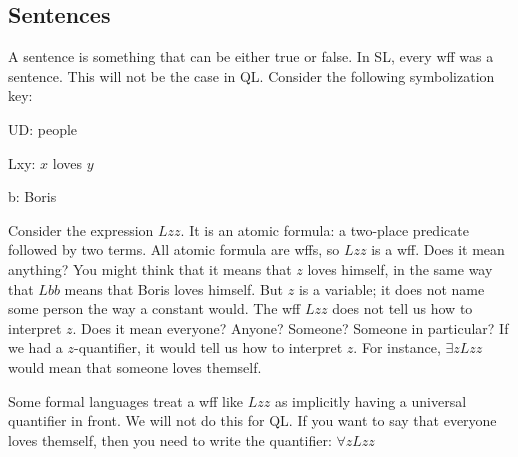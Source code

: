 






\subsection{Sentences}

A {sentence} is something that can be either true or false. In SL, every wff was a sentence. This will not be the case in QL. Consider the following symbolization key:
\begin{ekey}
\item[UD:] people
\item[Lxy:] $x$ loves $y$
\item[b:] Boris
\end{ekey}
Consider the expression $Lzz$. It is an atomic formula: a two-place predicate followed by two terms. All atomic formula are wffs, so $Lzz$ is a wff. Does it mean anything? You might think that it means that $z$ loves himself, in the same way that $Lbb$ means that Boris loves himself. But $z$ is a variable; it does not name some person the way a constant would. The wff $Lzz$ does not tell us how to interpret $z$. Does it mean everyone? Anyone? Someone? Someone in particular? If we had a $z$-quantifier, it would tell us how to interpret $z$. For instance, $\exists zLzz$ would mean that someone loves themself.

Some formal languages treat a wff like $Lzz$ as implicitly having a universal quantifier in front. We will not do this for QL. If you want to say that everyone loves themself, then you need to write the quantifier: $\forall zLzz$


